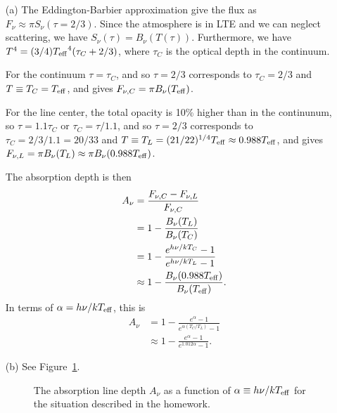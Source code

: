\problemset

\begin{problem}
\begin{enumerate}
\item[(a)]
The Eddington-Barbier approximation give the flux as $F_\nu \approx \pi S_\nu(\tau = 2/3)$. Since the atmosphere is in LTE and we can neglect scattering, we have $S_\nu(\tau) = B_\nu(T(\tau))$. Furthermore, we have $T^4 = (3/4) {T_\mathrm{eff}}^4 (\tau_C + 2/3)$, where $\tau_C$ is the optical depth in the continuum. 

For the continuum $\tau = \tau_C$, and so $\tau = 2/3$ corresponds to $\tau_C = 2/3$ and $T \equiv T_C = T_\mathrm{eff}$, and gives $F_{\nu,C} = \pi B_\nu(T_\mathrm{eff})$.

For the line center, the total opacity is 10\% higher than in the continunum, so $\tau = 1.1\tau_C$ or $\tau_C=\tau/1.1$, and so $\tau=2/3$ corresponds to $\tau_C=2/3/1.1 = 20/33$ and $T \equiv T_L = (21/22)^{1/4} T_\mathrm{eff} \approx 0.988T_\mathrm{eff}$, and gives $F_{\nu,L} = \pi B_\nu(T_L) \approx \pi B_\nu(0.988T_\mathrm{eff})$.

The absorption depth is then
\begin{align}
A_\nu &= \frac{F_{\nu,C}-F_{\nu,L}}{F_{\nu,C}}\\
& = 1-\frac{B_\nu(T_L)}{B_\nu(T_C)}\\
&= 1 - \frac{e^{h\nu/kT_C}-1}{e^{h\nu/kT_L}-1}\\
& \approx 1-\frac{B_\nu(0.988T_\mathrm{eff})}{B_\nu(T_\mathrm{eff})}.\\
\end{align}
In terms of $\alpha = h\nu/kT_\mathrm{eff}$, this is
\begin{align}
A_\nu &=1 - \frac{e^{\alpha}-1}{e^{\alpha(T_C/T_L)}-1}\\
&\approx 1 - \frac{e^{\alpha}-1}{e^{1.012\alpha}-1}.
\end{align}

\item[(b)] See Figure~\ref{figure:problem-line-depth}.

\begin{figure}
\footnotesize
{}
\caption{The absorption line depth $A_\nu$  as a function of $\alpha \equiv h\nu/kT_\mathrm{eff}$ for the situation described in the homework.}
\label{figure:problem-line-depth}
\end{figure}


\end{enumerate}
\end{problem}
